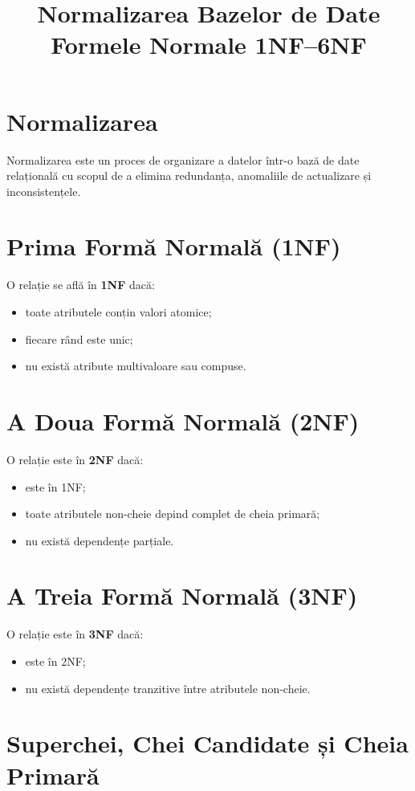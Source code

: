 \documentclass[12pt,a4paper]{article}
\title{Normalizarea Bazelor de Date \\ Formele Normale 1NF--6NF}
\author{}
\date{}
\begin{document}
\maketitle

\section{Normalizarea}
Normalizarea este un proces de organizare a datelor într-o bază de date relațională
cu scopul de a elimina redundanța, anomaliile de actualizare și inconsistențele.

\section{Prima Formă Normală (1NF)}
O relație se află în \textbf{1NF} dacă:
\begin{itemize}[noitemsep]
    \item toate atributele conțin valori atomice;
    \item fiecare rând este unic;
    \item nu există atribute multivaloare sau compuse.
\end{itemize}

\section{A Doua Formă Normală (2NF)}
O relație este în \textbf{2NF} dacă:
\begin{itemize}[noitemsep]
    \item este în 1NF;
    \item toate atributele non-cheie depind complet de cheia primară;
    \item nu există dependențe parțiale.
\end{itemize}

\section{A Treia Formă Normală (3NF)}
O relație este în \textbf{3NF} dacă:
\begin{itemize}[noitemsep]
    \item este în 2NF;
    \item nu există dependențe tranzitive între atributele non-cheie.
\end{itemize}

\section{Superchei, Chei Candidate și Cheia Primară}
\end{document}

